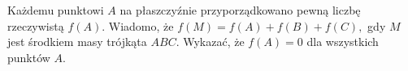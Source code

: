 \begin{problem}{1}
	Każdemu punktowi $A$ na płaszczyźnie przyporządkowano pewną liczbę rzeczywistą $f(A).$ Wiadomo, że $f(M)=f(A)+f(B)+f(C),$ gdy $M$ jest środkiem masy trójkąta $ABC.$ Wykazać, że $f(A)=0$ dla wszystkich punktów $A.$
\end{problem}
